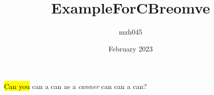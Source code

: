 \documentclass{article}
\title{ExampleForCBreomve}
\author{mzh045 }
\date{February 2023}
\begin{document}
\maketitle

\hl{Can you} can a can as a \emph{canner} can can a can?
\end{document}
